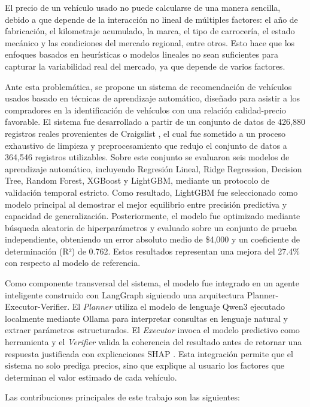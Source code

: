 \documentclass[conference]{IEEEtran}
\begin{document}
El precio de un vehículo usado no puede calcularse de una manera sencilla, debido a que depende de la interacción no lineal de múltiples  factores: el año de fabricación, el kilometraje acumulado, la marca, el tipo de carrocería, el estado mecánico y las condiciones del mercado regional, entre otros. Esto hace que los enfoques basados en heurísticas o modelos lineales no sean suficientes para capturar la variabilidad real del mercado, ya que depende de varios factores.

Ante esta problemática, se propone un sistema de recomendación de vehículos usados basado en técnicas de aprendizaje automático, diseñado para asistir a los compradores en la identificación de vehículos con una relación calidad-precio favorable. El sistema fue desarrollado a partir de un conjunto de datos de 426,880 registros reales provenientes de Craigslist \cite{sulianta2024}, el cual fue sometido a un proceso exhaustivo de limpieza y preprocesamiento que redujo el conjunto de datos a 364,546 registros utilizables. Sobre este conjunto se evaluaron seis modelos de aprendizaje automático, incluyendo Regresión Lineal, Ridge Regression, Decision Tree, Random Forest, XGBoost y LightGBM, mediante un protocolo de validación temporal estricto. Como resultado, LightGBM \cite{ke2017} fue seleccionado como modelo principal al demostrar el mejor equilibrio entre precisión predictiva y capacidad de generalización. Posteriormente, el modelo fue optimizado mediante búsqueda aleatoria de hiperparámetros y evaluado sobre un conjunto de prueba independiente, obteniendo un error absoluto medio de \$4,000 y un coeficiente de determinación (R²) de 0.762. Estos resultados representan una mejora del 27.4\% con respecto al modelo de referencia.

Como componente transversal del sistema, el modelo fue integrado en un agente inteligente construido con LangGraph siguiendo una arquitectura Planner-Executor-Verifier. El \textit{Planner} utiliza el modelo de lenguaje Qwen3 ejecutado localmente mediante Ollama para interpretar consultas en lenguaje natural y extraer parámetros estructurados. El \textit{Executor} invoca el modelo predictivo como herramienta y el \textit{Verifier} valida la coherencia del resultado antes de retornar una respuesta justificada con explicaciones SHAP \cite{lundberg2017}. Esta integración permite que el sistema no solo prediga precios, sino que explique al usuario los factores que determinan el valor estimado de cada vehículo.

Las contribuciones principales de este trabajo son las siguientes:
\end{document}

